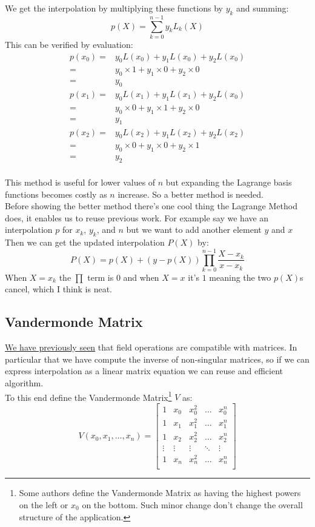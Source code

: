 We get the interpolation by multiplying these functions by $y_k$ and summing:
\[p(X) = \sum_{k=0}^{n-1}y_kL_k(X)\]
This can be verified by evaluation:
\begin{equation*}
\begin{aligned}
p(x_0) =& y_0L(x_0) +y_1L(x_0)+y_2L(x_0) \\
=& y_0\times 1 + y_1\times 0 + y_2\times 0 \\
=& y_0\\
p(x_1) =& y_0L(x_1) +y_1L(x_1)+y_2L(x_0) \\
=& y_0\times 0 + y_1\times 1 + y_2\times 0 \\
=& y_1\\
p(x_2) =& y_0L(x_2) +y_1L(x_2)+y_2L(x_2) \\
=& y_0\times 0 + y_1\times 0 + y_2\times 1 \\
=& y_2\\
\end{aligned}
\end{equation*}

This method is useful for lower values of $n$ but expanding the Lagrange basis functions becomes costly as $n$ increase.
So a better method is needed.
\\

Before showing the better method there's one cool thing the Lagrange Method does, 
it enables us to reuse previous work.
For example say we have an interpolation $p$ for $x_k$, $y_k$, and $n$ but we want to add another element $y$ and $x$
Then we can get the updated interpolation $P(X)$ by:
\[P(X) = p(X)+(y-p(X))\prod_{k=0}^{n-1}\frac{X-x_k}{x-x_k}\]
When $X=x_k$ the $\prod$ term is $0$ and when $X=x$ it's $1$ meaning the two $p(X)$s cancel,
which I think is neat.

\subsection{Vandermonde Matrix}
\hyperref[matrix:useful-preamble]{We have previously seen} that field operations are compatible with matrices.
In particular that we have compute the inverse of non-singular matrices,
so if we can express interpolation as a linear matrix equation we can reuse and efficient algorithm.
\\

To this end define the Vandermonde Matrix\footnote{
	Some authors define the Vandermonde Matrix as having the highest powers on the left or $x_0$ on the bottom.
	Such minor change don't change the overall structure of the application. }
$V$ as:
\[V(x_0,x_1,\dots,x_n) = \begin{bmatrix} 
	1&x_0&x_0^2&\dots&x_0^n \\
	1&x_1&x_1^2&\dots&x_1^n \\
	1&x_2&x_2^2&\dots&x_2^n \\
	\vdots&\vdots&\vdots&\ddots&\vdots \\
	1&x_n&x_n^2&\dots&x_n^n \\
\end{bmatrix}\]

